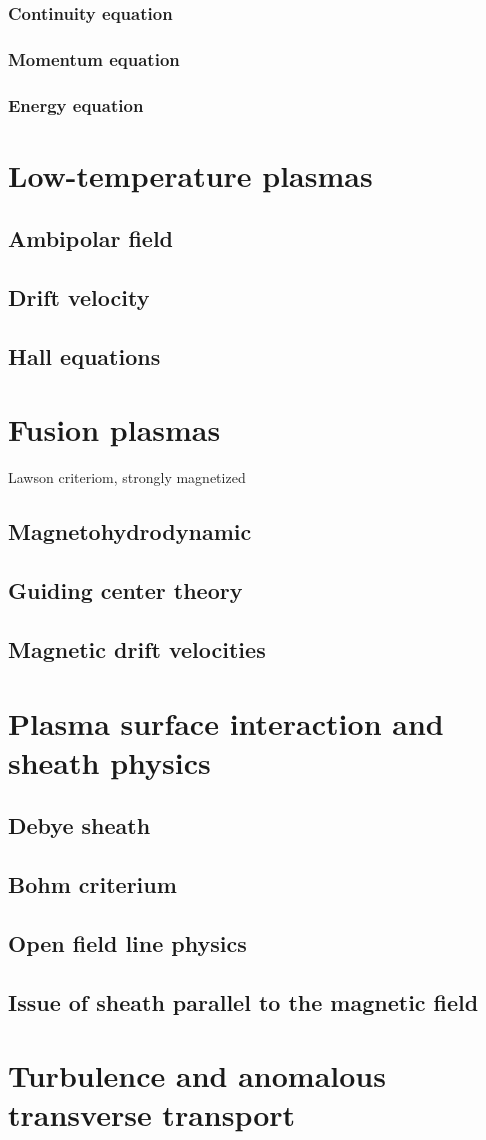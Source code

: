 			\subsubsection{Continuity equation}
			\subsubsection{Momentum equation}
			\subsubsection{Energy equation}
	\section{Low-temperature plasmas}
		\subsection{Ambipolar field}
		\subsection{Drift velocity}
		\subsection{Hall equations}
	\section{Fusion plasmas}
	Lawson criteriom, strongly magnetized
		\subsection{Magnetohydrodynamic}
		\subsection{Guiding center theory}
		\subsection{Magnetic drift velocities}
	\section{Plasma surface interaction and sheath physics}
			\subsection{Debye sheath}
			\subsection{Bohm criterium}
			\subsection{Open field line physics}
			\subsection{Issue of sheath parallel to the magnetic field}
	\section{Turbulence and anomalous transverse transport}
		